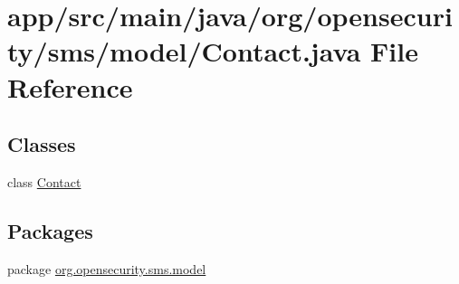 \hypertarget{a00017}{\section{app/src/main/java/org/opensecurity/sms/model/\+Contact.java File Reference}
\label{a00017}
}
\subsection*{Classes}
\begin{DoxyCompactItemize}
\item 
class \hyperlink{a00005}{Contact}
\end{DoxyCompactItemize}
\subsection*{Packages}
\begin{DoxyCompactItemize}
\item 
package \hyperlink{a00035}{org.\+opensecurity.\+sms.\+model}
\end{DoxyCompactItemize}
